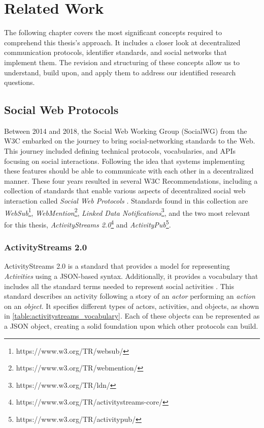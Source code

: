 \chapter{Related Work}
\label{cha:relatedwork}

The following chapter covers the most significant concepts required to comprehend this thesis's approach. It includes a closer look at decentralized communication protocols, identifier standards, and social networks that implement them. The revision and structuring of these concepts allow us to understand, build upon, and apply them to address our identified research questions.

\section{Social Web Protocols}
Between 2014 and 2018, the Social Web Working Group (SocialWG) from the W3C embarked on the journey to bring social-networking standards to the Web. This journey included defining technical protocols, vocabularies, and APIs focusing on social interactions. Following the idea that systems implementing these features should be able to communicate with each other in a decentralized manner. These four years resulted in several W3C Recommendations, including a collection of standards that enable various aspects of decentralized social web interaction called \emph{Social Web Protocols} \cite{celik_prodromou_le_hors_2014}. Standards found in this collection are \emph{WebSub}\footnote{https://www.w3.org/TR/websub/}, \emph{WebMention}\footnote{https://www.w3.org/TR/webmention/}, \emph{Linked Data Notifications}\footnote{https://www.w3.org/TR/ldn/}, and the two most relevant for this thesis, \emph{ActivityStreams 2.0}\footnote{https://www.w3.org/TR/activitystreams-core/} and \emph{ActivityPub}\footnote{https://www.w3.org/TR/activitypub/}.

\subsection{ActivityStreams 2.0}\label{subsec:activitystreams}


ActivityStreams 2.0 is a standard that provides a model for representing \emph{Activities} using a JSON-based syntax. Additionally, it provides a vocabulary that includes all the standard terms needed to represent social activities \cite{snell_prodromou_2017}. This standard describes an activity following a story of an \emph{actor} performing an \emph{action} on an \emph{object}. It specifies different types of actors, activities, and objects, as shown in \autoref{table:activitystreams_vocabulary}. Each of these objects can be represented as a JSON object, creating a solid foundation upon which other protocols can build. 

